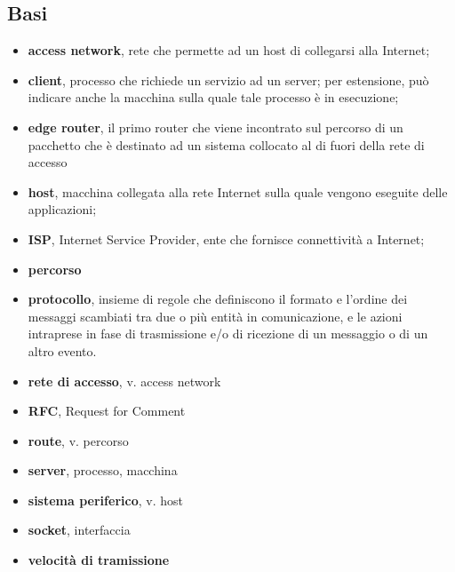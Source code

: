 \documentclass[12pt,a4paper]{article}
\begin{document}
\subsection{Basi}
\begin{itemize}
  \item \textbf{access network}, rete che permette ad un host di
    collegarsi alla Internet;
  \item \textbf{client}, processo che richiede un servizio ad un server;
    per estensione, può indicare anche la macchina sulla quale tale
    processo è in esecuzione;
  \item \textbf{edge router}, il primo router che viene incontrato sul
    percorso di un pacchetto che è destinato ad un sistema collocato al
    di fuori della rete di accesso
  \item \textbf{host}, macchina collegata alla rete Internet sulla quale
    vengono eseguite delle applicazioni;
  \item \textbf{ISP}, Internet Service Provider, ente che fornisce
    connettività a Internet;
  \item \textbf{percorso} %
  \item \textbf{protocollo}, insieme di regole che definiscono il formato
    e l'ordine dei messaggi scambiati tra due o più entità in
    comunicazione, e le azioni intraprese in fase di trasmissione e/o
    di ricezione di un messaggio o di un altro evento.
  \item \textbf{rete di accesso}, v. access network
  \item \textbf{RFC}, Request for Comment
  \item \textbf{route}, v. percorso
  \item \textbf{server}, processo, macchina
  \item \textbf{sistema periferico}, v. host
  \item \textbf{socket}, interfaccia
  \item \textbf{velocità di tramissione}
\end{itemize}
\end{document}
